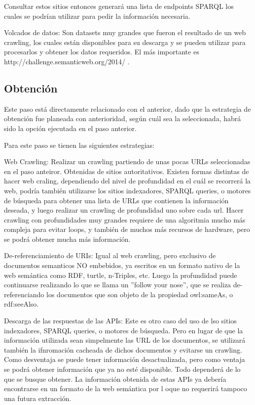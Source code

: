Consultar estos sitios entonces generará una lista de endpoints SPARQL los cuales se podrían utilizar para pedir la información necesaria.

Volcados de datos: Son datasets muy grandes que fueron el resultado de un web crawling, los cuales están disponibles para su descarga 
y se pueden utilizar para procesarlos y obtener los datos requeridos. El más importante es http://challenge.semanticweb.org/2014/ .

\subsection{Obtención}

Este paso está directamente relacionado con el anterior, dado que la estrategia de obtención fue planeada con anterioridad, según 
cuál sea la seleccionada, habrá sido la opción ejecutada en el paso anterior.

Para este paso se tienen las siguientes estrategias:

Web Crawling: Realizar un crawling partiendo de unas pocas URLs seleccionadas en el paso anteiror. Obtenidas de sitios autoritativos.
Existen formas distintas de hacer web craling, dependiendo del nivel de profundidad en el cuál se recorrerá la web, podría también utilizarse los 
sitios indexadores, SPARQL queries, o motores de búsqueda para obtener una lista de URLs que contienen la información deseada, y luego realizar un crawling de profundidad uno sobre cada url.
Hacer crawling con profundidades muy grandes requiere de una algoritmia mucho más compleja para evitar loops, y también de muchos más recursos de hardware, pero se podrá obtener mucha más información.

De-referenciamiento de URIs: Igual al web crawling, pero exclusivo de documentos semanticos NO embebidos, ya escritos en un formato nativo de la web semántica como RDF, turtle, n-Triples, etc.
Luego la profundidad puede continuarse realizando lo que se llama un ''follow your nose'', que se realiza de-referenciando los documentos que son objeto de la propiedad owl:sameAs, o rdf:seeAlso.

Descarga de las respuestas de las APIs: Este es otro caso del uso de lso sitios indexadores, SPARQL queries, o motores de búsqueda. Pero en lugar de 
que la información  utilizada sean simpelmente las URL de los documentos, se utilizará también la ifnromación cacheada de dichos documentos y evitarse un crawling.
Como desventaja se puede tener información desactualizada, pero como ventaja se podrá obtener información que ya no esté disponible. Todo dependerá de lo que se busque obtener.
La información obtenida de estas APIs ya debería encontrarse en un formato de la web semántica por l oque no requerirá tampoco una futura extracción.

